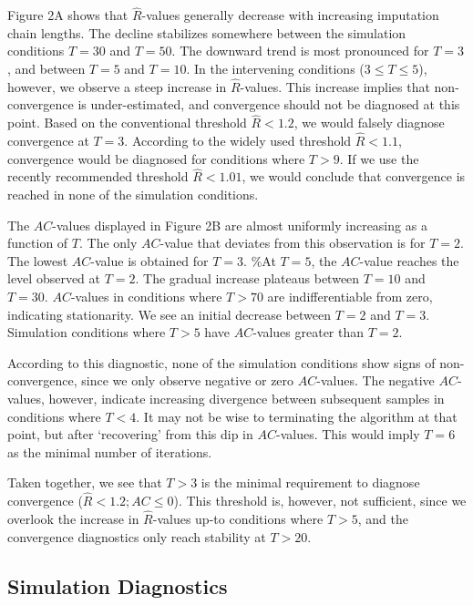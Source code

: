 \documentclass[
  Royal, times, sageapa]{sagej}
\begin{document}
Figure 2A shows that \(\widehat{R}\)-values generally decrease with
increasing imputation chain lengths. The decline stabilizes somewhere
between the simulation conditions \(T=30\) and \(T=50\). The downward
trend is most pronounced for \(T=3\), and between \(T = 5\) and
\(T = 10\). In the intervening conditions (\(3 \leq T \leq 5\)),
however, we observe a steep increase in \(\widehat{R}\)-values. This
increase implies that non-convergence is under-estimated, and
convergence should not be diagnosed at this point. Based on the
conventional threshold \(\widehat{R} < 1.2\), we would falsely diagnose
convergence at \(T=3\). According to the widely used threshold
\(\widehat{R} < 1.1\), convergence would be diagnosed for conditions
where \(T>9\). If we use the recently recommended threshold
\(\widehat{R} < 1.01\), we would conclude that convergence is reached in
none of the simulation conditions.

The \(AC\)-values displayed in Figure 2B are almost uniformly increasing
as a function of \(T\). The only \(AC\)-value that deviates from this
observation is for \(T=2\). The lowest \(AC\)-value is obtained for
\(T=3\). \%At \(T=5\), the \(AC\)-value reaches the level observed at
\(T=2\). The gradual increase plateaus between \(T=10\) and \(T=30\).
\(AC\)-values in conditions where \(T>70\) are indifferentiable from
zero, indicating stationarity. We see an initial decrease between
\(T=2\) and \(T=3\). Simulation conditions where \(T>5\) have
\(AC\)-values greater than \(T=2\).

According to this diagnostic, none of the simulation conditions show
signs of non-convergence, since we only observe negative or zero
\(AC\)-values. The negative \(AC\)-values, however, indicate increasing
divergence between subsequent samples in conditions where \(T<4\). It
may not be wise to terminating the algorithm at that point, but after
`recovering' from this dip in \(AC\)-values. This would imply \(T=6\) as
the minimal number of iterations.

Taken together, we see that \(T>3\) is the minimal requirement to
diagnose convergence (\(\widehat{R} < 1.2; AC \leq 0\)). This threshold
is, however, not sufficient, since we overlook the increase in
\(\widehat{R}\)-values up-to conditions where \(T>5\), and the
convergence diagnostics only reach stability at \(T>20\).

\hypertarget{simulation-diagnostics}{%
\subsection{Simulation Diagnostics}\label{simulation-diagnostics}}
\end{document}
